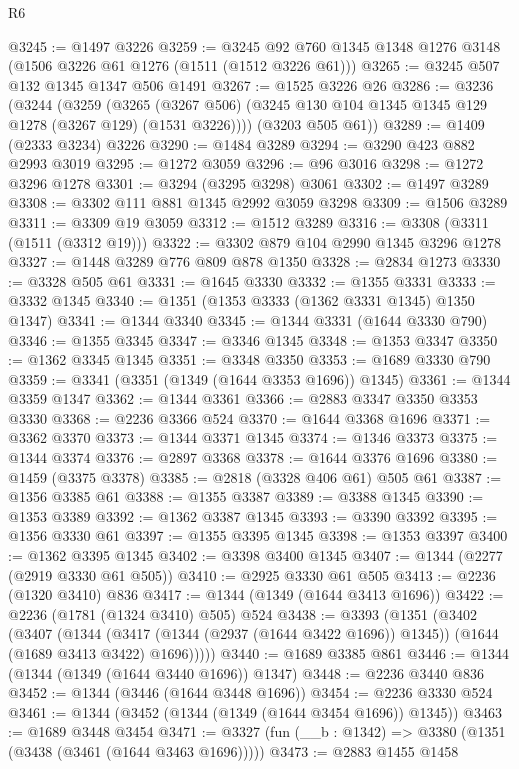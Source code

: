 \begin{lexlean}{R6}
\begin{coremodule}
@3245 := @1497 @3226
@3259 := @3245 @92 @760 @1345 @1348 @1276 @3148 (@1506 @3226 @61 @1276 (@1511 (@1512 @3226 @61)))
@3265 := @3245 @507 @132 @1345 @1347 @506 @1491
@3267 := @1525 @3226 @26
@3286 := @3236
    (@3244
      (@3259
        (@3265 (@3267 @506) (@3245 @130 @104 @1345 @1345 @129 @1278 (@3267 @129) (@1531 @3226))))
      (@3203 @505 @61))
@3289 := @1409 (@2333 @3234) @3226
@3290 := @1484 @3289
@3294 := @3290 @423 @882 @2993 @3019
@3295 := @1272 @3059
@3296 := @96 @3016
@3298 := @1272 @3296 @1278
@3301 := @3294 (@3295 @3298) @3061
@3302 := @1497 @3289
@3308 := @3302 @111 @881 @1345 @2992 @3059 @3298
@3309 := @1506 @3289
@3311 := @3309 @19 @3059
@3312 := @1512 @3289
@3316 := @3308 (@3311 (@1511 (@3312 @19)))
@3322 := @3302 @879 @104 @2990 @1345 @3296 @1278
@3327 := @1448 @3289 @776 @809 @878 @1350
@3328 := @2834 @1273
@3330 := @3328 @505 @61
@3331 := @1645 @3330
@3332 := @1355 @3331
@3333 := @3332 @1345
@3340 := @1351 (@1353 @3333 (@1362 @3331 @1345) @1350 @1347)
@3341 := @1344 @3340
@3345 := @1344 @3331 (@1644 @3330 @790)
@3346 := @1355 @3345
@3347 := @3346 @1345
@3348 := @1353 @3347
@3350 := @1362 @3345 @1345
@3351 := @3348 @3350
@3353 := @1689 @3330 @790
@3359 := @3341 (@3351 (@1349 (@1644 @3353 @1696)) @1345)
@3361 := @1344 @3359 @1347
@3362 := @1344 @3361
@3366 := @2883 @3347 @3350 @3353 @3330
@3368 := @2236 @3366 @524
@3370 := @1644 @3368 @1696
@3371 := @3362 @3370
@3373 := @1344 @3371 @1345
@3374 := @1346 @3373
@3375 := @1344 @3374
@3376 := @2897 @3368
@3378 := @1644 @3376 @1696
@3380 := @1459 (@3375 @3378)
@3385 := @2818 (@3328 @406 @61) @505 @61
@3387 := @1356 @3385 @61
@3388 := @1355 @3387
@3389 := @3388 @1345
@3390 := @1353 @3389
@3392 := @1362 @3387 @1345
@3393 := @3390 @3392
@3395 := @1356 @3330 @61
@3397 := @1355 @3395 @1345
@3398 := @1353 @3397
@3400 := @1362 @3395 @1345
@3402 := @3398 @3400 @1345
@3407 := @1344 (@2277 (@2919 @3330 @61 @505))
@3410 := @2925 @3330 @61 @505
@3413 := @2236 (@1320 @3410) @836
@3417 := @1344 (@1349 (@1644 @3413 @1696))
@3422 := @2236 (@1781 (@1324 @3410) @505) @524
@3438 := @3393
    (@1351
      (@3402
        (@3407
          (@1344
            (@3417 (@1344 (@2937 (@1644 @3422 @1696)) @1345))
            (@1644 (@1689 @3413 @3422) @1696)))))
@3440 := @1689 @3385 @861
@3446 := @1344 (@1344 (@1349 (@1644 @3440 @1696)) @1347)
@3448 := @2236 @3440 @836
@3452 := @1344 (@3446 (@1644 @3448 @1696))
@3454 := @2236 @3330 @524
@3461 := @1344 (@3452 (@1344 (@1349 (@1644 @3454 @1696)) @1345))
@3463 := @1689 @3448 @3454
@3471 := @3327 (fun (__b : @1342) => @3380 (@1351 (@3438 (@3461 (@1644 @3463 @1696)))))
@3473 := @2883 @1455 @1458

\end{coremodule}
\end{lexlean}
